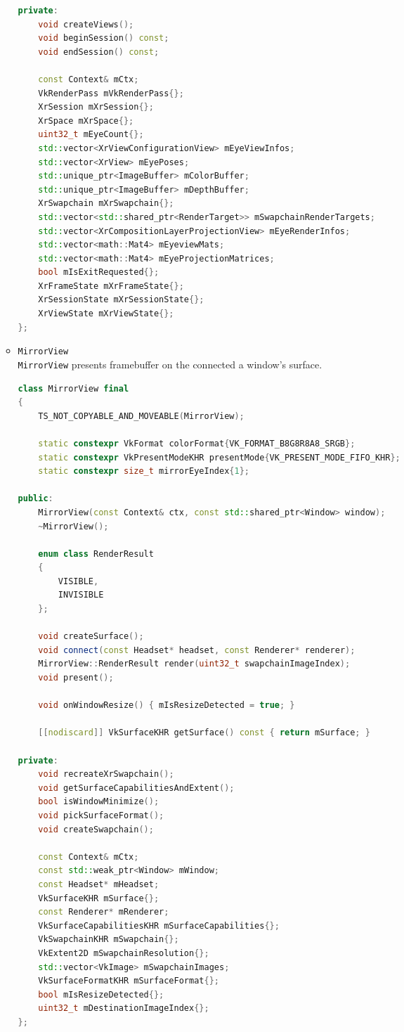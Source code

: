 \begin{itemize}
\begin{itemize}
\begin{lstlisting}[language=c++, caption=\texttt{Headset} class (./engine/src/core/headset.h)]
private:
    void createViews();
    void beginSession() const;
    void endSession() const;

    const Context& mCtx;
    VkRenderPass mVkRenderPass{};
    XrSession mXrSession{};
    XrSpace mXrSpace{};
    uint32_t mEyeCount{};
    std::vector<XrViewConfigurationView> mEyeViewInfos;
    std::vector<XrView> mEyePoses;
    std::unique_ptr<ImageBuffer> mColorBuffer;
    std::unique_ptr<ImageBuffer> mDepthBuffer;
    XrSwapchain mXrSwapchain{};
    std::vector<std::shared_ptr<RenderTarget>> mSwapchainRenderTargets;
    std::vector<XrCompositionLayerProjectionView> mEyeRenderInfos;
    std::vector<math::Mat4> mEyeviewMats;
    std::vector<math::Mat4> mEyeProjectionMatrices;
    bool mIsExitRequested{};
    XrFrameState mXrFrameState{};
    XrSessionState mXrSessionState{};
    XrViewState mXrViewState{};
};
\end{lstlisting}
        \item \texttt{MirrorView}\\
        \texttt{MirrorView} presents framebuffer on the connected a window's surface.
\begin{lstlisting}[language=c++, caption=\texttt{MirrorView} class (./engine/src/core/mirror\_view.h)]
class MirrorView final
{
    TS_NOT_COPYABLE_AND_MOVEABLE(MirrorView);

    static constexpr VkFormat colorFormat{VK_FORMAT_B8G8R8A8_SRGB};
    static constexpr VkPresentModeKHR presentMode{VK_PRESENT_MODE_FIFO_KHR};
    static constexpr size_t mirrorEyeIndex{1};

public:
    MirrorView(const Context& ctx, const std::shared_ptr<Window> window);
    ~MirrorView();

    enum class RenderResult
    {
        VISIBLE,
        INVISIBLE
    };

    void createSurface();
    void connect(const Headset* headset, const Renderer* renderer);
    MirrorView::RenderResult render(uint32_t swapchainImageIndex);
    void present();

    void onWindowResize() { mIsResizeDetected = true; }

    [[nodiscard]] VkSurfaceKHR getSurface() const { return mSurface; }

private:
    void recreateXrSwapchain();
    void getSurfaceCapabilitiesAndExtent();
    bool isWindowMinimize();
    void pickSurfaceFormat();
    void createSwapchain();

    const Context& mCtx;
    const std::weak_ptr<Window> mWindow;
    const Headset* mHeadset;
    VkSurfaceKHR mSurface{};
    const Renderer* mRenderer;
    VkSurfaceCapabilitiesKHR mSurfaceCapabilities{};
    VkSwapchainKHR mSwapchain{};
    VkExtent2D mSwapchainResolution{};
    std::vector<VkImage> mSwapchainImages;
    VkSurfaceFormatKHR mSurfaceFormat{};
    bool mIsResizeDetected{};
    uint32_t mDestinationImageIndex{};
};
\end{lstlisting}
    \end{itemize}
\end{itemize}